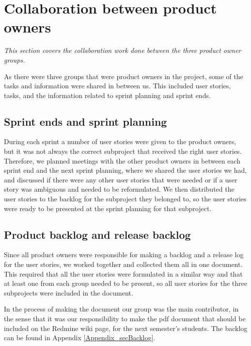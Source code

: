 \section{Collaboration between product owners}
\textit{This section covers the collaboration work done between the three product owner groups.}

As there were three groups that were product owners in the project, some of the tasks and information were shared in between us. This included user stories, tasks, and the information related to sprint planning and sprint ends.

\subsection{Sprint ends and sprint planning}
During each sprint a number of user stories were given to the product owners, but it was not always the correct subproject that received the right user stories. Therefore, we planned meetings with the other product owners in between each sprint end and the next sprint planning, where we shared the user stories we had, and discussed if there were any other user stories that were needed or if a user story was ambiguous and needed to be reformulated. We then distributed the user stories to the backlog for the subproject they belonged to, so the user stories were ready to be presented at the sprint planning for that subproject.

\subsection{Product backlog and release backlog}
Since all product owners were responsible for making a backlog and a release log for the user stories, we worked together and collected them all in one document. This required that all the user stories were formulated in a similar way and that at least one from each group needed to be present, so all user stories for the three subprojects were included in the document.

In the process of making the document our group was the main contributor, in the sense that it was our responsibility to make the pdf document that should be included on the Redmine wiki page, for the next semester’s students. The backlog can be found in Appendix \ref{Appendix_secBacklog}.